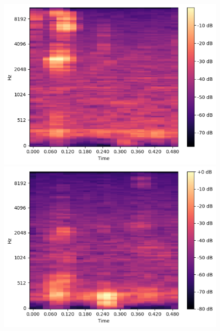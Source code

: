 \begin{figure}[t]
\begin{minipage}[b]{0.16\hsize}
        \includegraphics[width=\hsize]{img/melspec/rice-cookie.png}
    \end{minipage}
    \begin{minipage}[b]{0.16\hsize}
        \centering
        \includegraphics[width=\hsize]{img/melspec/gratin.png}
    \end{minipage}
    \begin{minipage}[b]{0.16\hsize}
        \centering

\end{minipage}
\end{figure}
